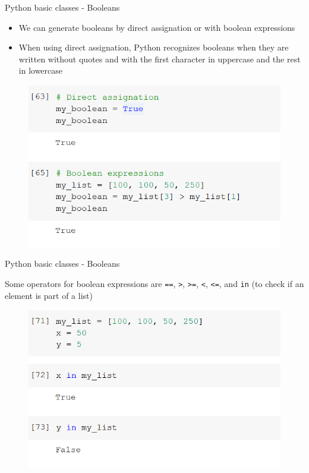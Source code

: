 \documentclass[aspectratio=169]{beamer}
\begin{document}
\begin{frame}{Python basic classes - Booleans}

	\begin{itemize}	
		\item We can generate booleans by direct assignation or with boolean expressions
		\item When using direct assignation, Python recognizes booleans when they are written without quotes and with the first character in uppercase and the rest in lowercase
	\end{itemize}

	\begin{figure}
		\centering
		\includegraphics[width=0.6\linewidth]{img/bool_assignation.png}
	\end{figure}

\end{frame}

\begin{frame}{Python basic classes - Booleans}

	Some operators for boolean expressions are \texttt{==}, \texttt{>}, \texttt{>=}, \texttt{<}, \texttt{<=}, and \texttt{in} (to check if an element is part of a list)

	\begin{figure}
		\centering
		\includegraphics[width=0.6\linewidth]{img/bool_in.png}
	\end{figure}

\end{frame}
\end{document}
